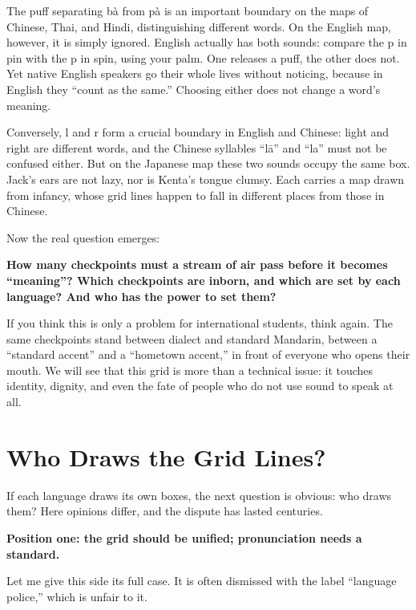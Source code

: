 The puff separating bà from pà is an important boundary on the maps of Chinese, Thai, and Hindi, distinguishing different words. On the English map, however, it is simply ignored. English actually has both sounds: compare the p in pin with the p in spin, using your palm. One releases a puff, the other does not. Yet native English speakers go their whole lives without noticing, because in English they ``count as the same.'' Choosing either does not change a word's meaning.

Conversely, l and r form a crucial boundary in English and Chinese: light and right are different words, and the Chinese syllables ``lā'' and ``la'' must not be confused either. But on the Japanese map these two sounds occupy the same box. Jack's ears are not lazy, nor is Kenta's tongue clumsy. Each carries a map drawn from infancy, whose grid lines happen to fall in different places from those in Chinese.

Now the real question emerges:

\textbf{How many checkpoints must a stream of air pass before it becomes ``meaning''? Which checkpoints are inborn, and which are set by each language? And who has the power to set them?}

If you think this is only a problem for international students, think again. The same checkpoints stand between dialect and standard Mandarin, between a ``standard accent'' and a ``hometown accent,'' in front of everyone who opens their mouth. We will see that this grid is more than a technical issue: it touches identity, dignity, and even the fate of people who do not use sound to speak at all.

\section{Who Draws the Grid Lines?}
If each language draws its own boxes, the next question is obvious: who draws them? Here opinions differ, and the dispute has lasted centuries.

\textbf{Position one: the grid should be unified; pronunciation needs a standard.}

Let me give this side its full case. It is often dismissed with the label ``language police,'' which is unfair to it.

